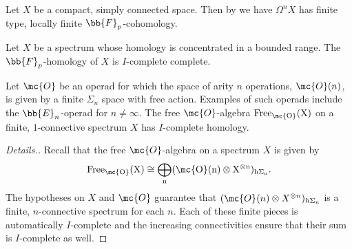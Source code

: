 \begin{ex}
    Let $X$ be a compact, simply connected space. 
    Then by \cite[Corollary 8.7.4]{schwartz1994unstable} we have $\Omega^n X$ has finite type, locally finite $\bb{F}_p$-cohomology.
\end{ex}

\begin{ex}
    Let $X$ be a spectrum whose homology is concentrated in a bounded range. 
    The $\bb{F}_p$-homology of $X$ is $I$-complete complete.
\end{ex}

\begin{ex}
    Let $\mc{O}$ be an operad for which the space of arity $n$ operations, $\mc{O}(n)$, 
    is given by a finite $\Sigma_n$ space with free action.
    Examples of such operads include the $\bb{E}_n$-operad for $n \neq \infty$.
    The free $\mc{O}$-algebra $\rm{Free}_{\mc{O}}(X)$ on a finite, $1$-connective spectrum $X$ 
    has $I$-complete homology.
\end{ex}

\begin{proof}[Details.]
    Recall that the free $\mc{O}$-algebra on a spectrum $X$ is given by
    $$\rm{Free}_{\mc{O}}(X) \cong \bigoplus_{n} (\mc{O}(n) \otimes X^{\otimes n } )_{h\Sigma_n} .$$
    The hypotheses on $X$ and $\mc{O}$ guarantee that 
    $(\mc{O}(n) \otimes X^{\otimes n } )_{h\Sigma_n}$ 
    is a finite, $n$-connective spectrum for each $n$.
    Each of these finite pieces is automatically $I$-complete and the increasing connectivities
    ensure that their sum is $I$-complete as well.
\end{proof}


\printbibliography


